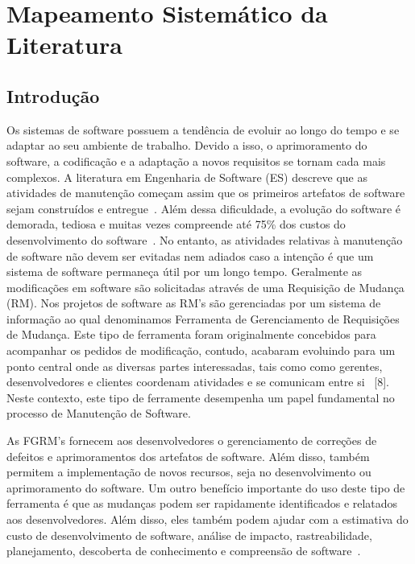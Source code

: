 
\chapter{Mapeamento Sistemático da Literatura}
\label{ch:mapeamento-sistematico}

\section{Introdução}
\label{sec:map-intro}

Os sistemas de software possuem a tendência de evoluir ao longo do tempo e se
adaptar ao seu ambiente de trabalho. Devido a isso, o aprimoramento do
software, a codificação e a adaptação a novos requisitos se tornam cada mais
complexos. A literatura em Engenharia de Software (ES) descreve que
as atividades de manutenção começam assim que os primeiros artefatos de software
sejam construídos e entregue~\cite{pigoski1996practical}. Além dessa dificuldade,
a evolução do software é demorada, tediosa e muitas vezes compreende até 75\%
dos custos do desenvolvimento do software~\cite{liu2012schedule}.  No entanto,
as atividades relativas à manutenção de software não devem ser evitadas nem
adiados caso a intenção é que um sistema de software permaneça útil por um longo
tempo. Geralmente as modificações em software são solicitadas através de uma
Requisição de Mudança (RM). Nos projetos de software as RM's são gerenciadas por
um sistema de informação ao qual denominamos Ferramenta de Gerenciamento de
Requisições de Mudança. Este tipo de ferramenta foram originalmente concebidos
para acompanhar os pedidos de modificação, contudo, acabaram evoluindo para um
ponto central onde as diversas partes interessadas, tais como  como gerentes,
desenvolvedores e clientes coordenam atividades e se comunicam entre
si~\cite{bertram2010communication} [8]. Neste contexto, este tipo de ferramente
desempenha um papel fundamental no processo de Manutenção de Software.

As FGRM's fornecem aos desenvolvedores o gerenciamento de correções de defeitos
e aprimoramentos dos artefatos de software. Além disso, também permitem a
implementação de novos recursos, seja no desenvolvimento ou aprimoramento do
software. Um outro benefício importante do uso deste tipo de ferramenta é que as
mudanças podem ser rapidamente identificados e relatados aos desenvolvedores.
Além disso, eles também podem ajudar com a estimativa do custo de
desenvolvimento de software, análise de impacto, rastreabilidade, planejamento,
descoberta de conhecimento e compreensão de software~\cite{cavalcanti2013bug}.

